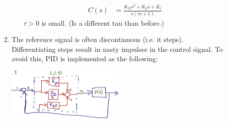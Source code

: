 \begin{enumerate}
\begin{enumerate}
\begin{enumerate}
\begin{enumerate}
                                    \begin{align*}
                                        C(s) &= \frac{K_D s^2 + K_p s + K_i}{s (\tau s + 1)}
                                    \end{align*}
                                    $\tau > 0$ is small. (Is a different tau than before.)
                            \end{enumerate}
                        \item The reference signal is often discontinuous (i.e. it steps). Differentiating steps result in nasty impulses in the control signal. To avoid this, PID is implemented as the following:

                            \begin{center}\includegraphics[width=0.5\textwidth,keepaspectratio]{images/5-9.png}\end{center}


\end{enumerate}
\end{enumerate}
\end{enumerate}
